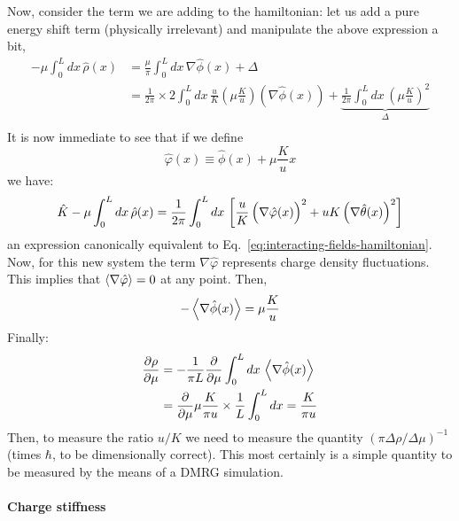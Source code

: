 Now, consider the term we are adding to the hamiltonian: let us add a pure energy shift term (physically irrelevant) and manipulate the above expression a bit,
\[
\begin{aligned}
	- \mu \int_0^L dx \, \hat \rho(x) &= \frac{\mu}{\pi} \int_0^L dx \, \nabla \hat \phi(x) + \Delta \\
	&= \frac{1}{2\pi} \times 2 \int_0^L dx \, \frac{u}{K} \left( \mu \frac{K}{u} \right) \left( \nabla \hat \phi(x) \right) + \underbrace{
		\frac{1}{2\pi} \int_0^L dx \, \left( \mu \frac{K}{u} \right)^2
	}_{\Delta} \\
\end{aligned}	
\]
It is now immediate to see that if we define
\[
	\hat \varphi(x) \equiv \hat \phi(x) + \mu \frac{K}{u} x
\]
we have:
\[
	\hat K - \mu \int_0^L dx \, \hat \rho(x) =  \frac{1}{2\pi} \int_0^L dx \, \left[ \frac{u}{K} \left( \vphantom{\hat\theta} \nabla \hat \varphi(x) \right)^2 + uK \left( \nabla \hat \theta(x) \right)^2 \right]
\]
an expression canonically equivalent to Eq.~\eqref{eq:interacting-fields-hamiltonian}. Now, for this new system the term $\nabla \hat \varphi$ represents charge density fluctuations. This implies that $\ev{\nabla \hat \varphi} = 0$ at any point. Then,
\[
	- \ev{\nabla \hat \phi(x)} = \mu \frac{K}{u}
\]
Finally:
\[
\begin{aligned}
	\pdv{\rho}{\mu}	&= - \frac{1}{\pi L} \pdv{}{\mu} \int_0^L dx \, \ev{\nabla \hat \phi(x)} \\
	&= \pdv{}{\mu} \mu \frac{K}{\pi u} \times \frac{1}{L} \int_0^L dx = \frac{K}{\pi u}
\end{aligned}
\]
Then, to measure the ratio $u/K$ we need to measure the quantity $(\pi \Delta \rho / \Delta \mu)^{-1}$ (times $\hbar$, to be dimensionally correct). This most certainly is a simple quantity to be measured by the means of a DMRG simulation.

\paragraph{Charge stiffness}

